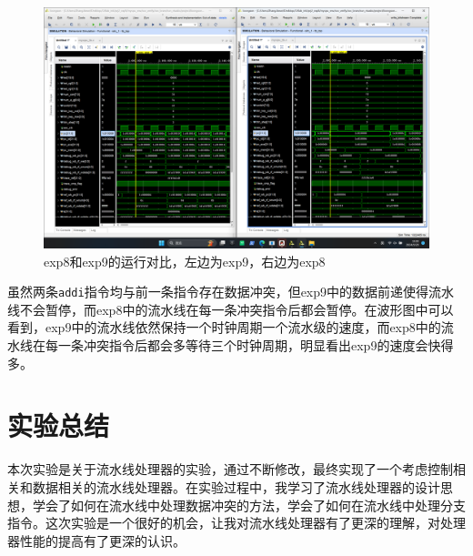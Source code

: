 \documentclass[UTF8]{report}
\begin{document}
\begin{figure}[H]
    \centering
    \includegraphics[width=\textwidth]{compare.png}
    \caption{exp8和exp9的运行对比，左边为exp9，右边为exp8}
\end{figure}

虽然两条\texttt{addi}指令均与前一条指令存在数据冲突，但exp9中的数据前递使得流水线不会暂停，而exp8中的流水线在每一条冲突指令后都会暂停。在波形图中可以看到，exp9中的流水线依然保持一个时钟周期一个流水级的速度，而exp8中的流水线在每一条冲突指令后都会多等待三个时钟周期，明显看出exp9的速度会快得多。


\section{实验总结}

本次实验是关于流水线处理器的实验，通过不断修改，最终实现了一个考虑控制相关和数据相关的流水线处理器。在实验过程中，我学习了流水线处理器的设计思想，学会了如何在流水线中处理数据冲突的方法，学会了如何在流水线中处理分支指令。这次实验是一个很好的机会，让我对流水线处理器有了更深的理解，对处理器性能的提高有了更深的认识。
\end{document}

